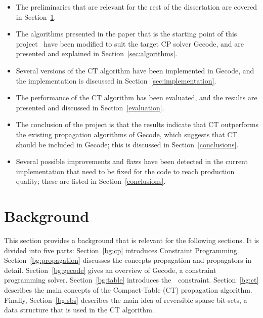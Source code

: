 \documentclass[a4paper,11pt]{article}
\newcommand{\Secref}[1]{Section~\ref{#1}}
\newcommand{\Table}{\Constraint{Table}}
\numberwithin{equation}{section}
\begin{document}
\begin{itemize}
  \item The preliminaries that are relevant for the rest of the dissertation
    are covered in \Secref{bg}.

  \item The algorithms presented in the paper that is the starting point of this 
    project~\cite{DBLP:conf/cp/DemeulenaereHLP16} 
    have been modified to suit the target CP solver Gecode, and are presented and explained in 
    \Secref{sec:algorithms}.

  \item Several versions of the CT algorithm have been implemented in Gecode, and
    the implementation is discussed in \Secref{sec:implementation}.

  \item The performance of the CT algorithm has been evaluated,
    and the results
    are presented and discussed in \Secref{evaluation}.

  \item The conclusion of the project is that the results indicate
    that CT outperforms the existing propagation algorithms of Gecode, which
    suggests that CT should be included in Gecode; this is discussed
    in \Secref{conclusions}.

  \item Several possible improvements and flaws have been detected in the current
    implementation that need to be fixed for the code to reach production 
    quality; these are listed in \Secref{conclusions}.
        
\end{itemize}

\section{Background}
\label{bg}


This section provides a background that is relevant for the
following sections. It is divided into five parts: \Secref{bg:cp}
introduces Constraint Programming. \Secref{bg:propagation} discusses
the concepts propagation and propagators in detail.
\Secref{bg:gecode} gives an overview
of Gecode, a constraint programming solver.
\Secref{bg:table} introduces the~\Table~constraint.
\Secref{bg:ct} describes the main concepts of the 
Compact-Table (CT) propagation algorithm.
Finally, \Secref{bg:sbs} 
describes the main idea of reversible sparse bit-sets,
a data structure that is used in the CT algorithm.
\end{document}
